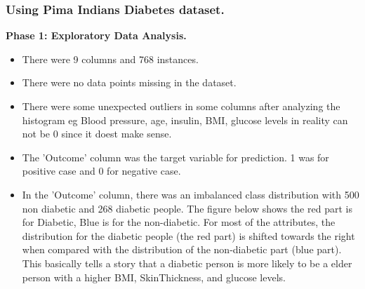 \documentclass[11pt]{article}
\begin{document}
\newpage
\begin{center}
	\subsubsection*{Using Pima Indians Diabetes dataset.}
\end{center}
\textbf{Phase 1: Exploratory Data Analysis.}
\begin{itemize}
	\item There were 9 columns and 768 instances.\\
	\item There were no data points missing in the dataset.\\
	\item There were some unexpected outliers in some columns after analyzing the histogram eg Blood pressure, age, insulin, BMI, glucose levels in reality can not be 0 since it doest make sense.\\
	\item The 'Outcome' column was the target variable for prediction. 1 was for positive case and 0 for negative case.\\
	\item In the 'Outcome' column, there was an imbalanced class distribution with 500 non diabetic and 268 diabetic people. The figure below shows the red part is for Diabetic, Blue is for the non-diabetic. For most of the attributes, the distribution for the diabetic people (the red part) is shifted towards the right when compared with the distribution of the non-diabetic part (blue part). This basically tells a story that a diabetic person is more likely to be a elder person with a higher BMI, SkinThickness, and glucose levels.\\
	\begin{figure}[h]
		\centerline{\small 
}
\end{figure}
\end{itemize}
\end{document}
